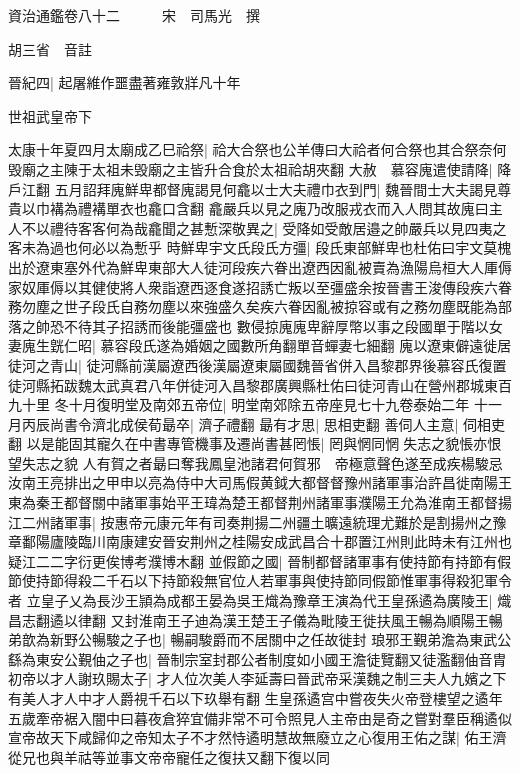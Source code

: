 資治通鑑卷八十二　　　宋　司馬光　撰

胡三省　音註

晉紀四|{
	起屠維作噩盡著雍敦牂凡十年}


世祖武皇帝下

太康十年夏四月太廟成乙巳祫祭|{
	祫大合祭也公羊傳曰大祫者何合祭也其合祭奈何毁廟之主陳于太祖未毁廟之主皆升合食於太祖祫胡夾翻}
大赦　慕容廆遣使請降|{
	降戶江翻}
五月詔拜廆鮮卑都督廆謁見何龕以士大夫禮巾衣到門|{
	魏晉間士大夫謁見尊貴以巾褠為禮褠單衣也龕口含翻}
龕嚴兵以見之廆乃改服戎衣而入人問其故廆曰主人不以禮待客客何為哉龕聞之甚慙深敬異之|{
	受降如受敵居邉之帥嚴兵以見四夷之客未為過也何必以為慙乎}
時鮮卑宇文氏段氏方彊|{
	段氏東部鮮卑也杜佑曰宇文莫槐出於遼東塞外代為鮮卑東部大人徒河段疾六眷出遼西因亂被賣為漁陽烏桓大人厙傉家奴厙傉以其健使將人衆詣遼西逐食遂招誘亡叛以至彊盛余按晉書王浚傳段疾六眷務勿塵之世子段氏自務勿塵以來強盛久矣疾六眷因亂被掠容或有之務勿塵既能為部落之帥恐不待其子招誘而後能彊盛也}
數侵掠廆廆卑辭厚幣以事之段國單于階以女妻廆生皝仁昭|{
	慕容段氏遂為婚姻之國數所角翻單音蟬妻七細翻}
廆以遼東僻遠徙居徒河之青山|{
	徒河縣前漢屬遼西後漢屬遼東屬國魏晉省併入昌黎郡界後慕容氏復置徒河縣拓跋魏太武真君八年併徒河入昌黎郡廣興縣杜佑曰徒河青山在營州郡城東百九十里}
冬十月復明堂及南郊五帝位|{
	明堂南郊除五帝座見七十九卷泰始二年}
十一月丙辰尚書令濟北成侯荀朂卒|{
	濟子禮翻}
朂有才思|{
	思相吏翻}
善伺人主意|{
	伺相吏翻}
以是能固其寵久在中書專管機事及遷尚書甚罔悵|{
	罔與惘同惘失志之貌悵亦恨望失志之貌}
人有賀之者朂曰奪我鳳皇池諸君何賀邪　帝極意聲色遂至成疾楊駿忌汝南王亮排出之甲申以亮為侍中大司馬假黄鉞大都督督豫州諸軍事治許昌徙南陽王東為秦王都督關中諸軍事始平王瑋為楚王都督荆州諸軍事濮陽王允為淮南王都督揚江二州諸軍事|{
	按惠帝元康元年有司奏荆揚二州疆土曠遠統理尤難於是割揚州之豫章鄱陽廬陵臨川南康建安晉安荆州之桂陽安成武昌合十郡置江州則此時未有江州也疑江二二字衍更俟博考濮博木翻}
並假節之國|{
	晉制都督諸軍事有使持節有持節有假節使持節得殺二千石以下持節殺無官位人若軍事與使持節同假節惟軍事得殺犯軍令者}
立皇子乂為長沙王頴為成都王晏為吳王熾為豫章王演為代王皇孫遹為廣陵王|{
	熾昌志翻遹以律翻}
又封淮南王子迪為漢王楚王子儀為毗陵王徙扶風王暢為順陽王暢弟歆為新野公暢駿之子也|{
	暢嗣駿爵而不居關中之任故徙封}
琅邪王覲弟澹為東武公繇為東安公覲伷之子也|{
	晉制宗室封郡公者制度如小國王澹徒覽翻又徒濫翻伷音胄}
初帝以才人謝玖賜太子|{
	才人位次美人李延壽曰晉武帝采漢魏之制三夫人九嬪之下有美人才人中才人爵視千石以下玖舉有翻}
生皇孫遹宫中嘗夜失火帝登樓望之遹年五歲牽帝裾入闇中曰暮夜倉猝宜備非常不可令照見人主帝由是奇之嘗對羣臣稱遹似宣帝故天下咸歸仰之帝知太子不才然恃遹明慧故無廢立之心復用王佑之謀|{
	佑王濟從兄也與羊祜等並事文帝帝寵任之復扶又翻下復以同}

